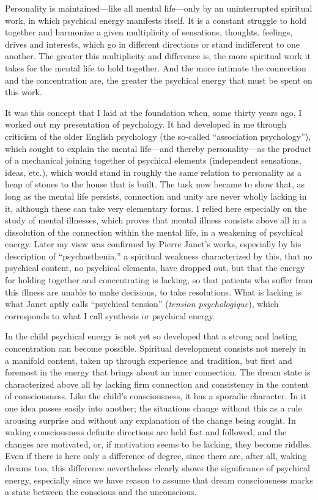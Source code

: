 \documentclass[12pt]{article}
\newcommand{\opage}[1]{\marginnote{\footnotesize\textit{[#1]}}}
\begin{document}
Personality is maintained---like all mental life---only by an uninterrupted
spiritual work, in which psychical energy manifests itself. It is a constant
struggle to hold together and harmonize a given multiplicity of sensations,
thoughts, feelings, drives and interests, which go in different directions or
stand indifferent to one another. The greater this multiplicity and difference
is, the more spiritual work it takes for the mental life to hold together. And
the more intimate the connection and the concentration are, the greater the
psychical energy that must be spent on this work.

It was this concept that I laid at the foundation when, some thirty years ago, I
worked out my presentation of psychology. It had developed in me
\opage{30}%
through criticism of the older English psychology (the so-called ``association
psychology''), which sought to explain the mental life---and thereby
personality---as the product of a mechanical joining together of psychical
elements (independent sensations, ideas, etc.), which would stand in roughly the
same relation to personality as a heap of stones to the house that is built.
The task now became to show that, as long as the mental life persists,
connection and unity are never wholly lacking in it, although these can take
very elementary forms. I relied here especially on the study of mental
illnesses, which proves that mental illness consists above all in a dissolution
of the connection within the mental life, in a weakening of psychical energy.
Later my view was confirmed by Pierre Janet's works, especially by his
description of ``psychasthenia,'' a spiritual weakness characterized by this,
that no psychical content, no psychical elements, have dropped out, but that the
energy for holding together and concentrating is lacking, so that patients who
suffer from this illness are unable to make decisions, to take resolutions. What
is lacking is what Janet aptly calls ``psychical tension''
\opage{31}%
(\textit{tension psychologique}), which corresponds to what I call synthesis or
psychical energy.

In the child psychical energy is not yet so developed that a strong and lasting
concentration can become possible. Spiritual development consists not merely in
a manifold content, taken up through experience and tradition, but first and
foremost in the energy that brings about an inner connection. The dream state
is characterized above all by lacking firm connection and consistency in the
content of consciousness. Like the child's consciousness, it has a sporadic
character. In it one idea passes easily into another; the situations change
without this as a rule arousing surprise and without any explanation of the
change being sought. In waking consciousness definite directions are held fast
and followed, and the changes are motivated, or, if motivation seems to be
lacking, they become riddles. Even if there is here only a difference of degree,
since there are, after all, waking dreams too, this difference nevertheless
clearly shows the significance of psychical energy, especially since we have
reason to assume that dream consciousness marks a state between the conscious
and the unconscious.
\end{document}
